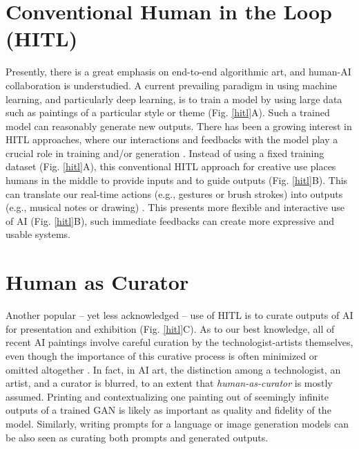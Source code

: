 \documentclass[letterpaper]{article} %
\begin{document}
\section{Conventional Human in the Loop (HITL)}

Presently, there is a great emphasis on end-to-end algorithmic art, and human-AI collaboration is understudied. A current prevailing paradigm in using machine learning, and particularly deep learning, is to train a model by using large data such as paintings of a particular style or theme (Fig. \ref{hitl}A). Such a trained model can reasonably generate new outputs. There has been a growing interest in HITL approaches, where our interactions and feedbacks with the model play a crucial role in training and/or generation \cite{HITLML}. Instead of using a fixed training dataset (Fig. \ref{hitl}A), this conventional HITL approach for creative use places humans in the middle to provide inputs and to guide outputs (Fig. \ref{hitl}B). This can translate our real-time actions (e.g., gestures or brush strokes) into outputs (e.g., musical notes or drawing) \cite{Fiebrink2009}. This presents more flexible and interactive use of AI (Fig. \ref{hitl}B), such immediate feedbacks can create more expressive and usable systems.

\section{Human as Curator}

Another popular -- yet less acknowledged -- use of HITL is to curate outputs of AI for presentation and exhibition (Fig. \ref{hitl}C). As to our best knowledge, all of recent AI paintings involve careful curation by the technologist-artists themselves, even though the importance of this curative process is often minimized or omitted altogether \cite[e.g.][]{GANEdmondBelamy, Elgammal2017}. In fact, in AI art, the distinction among a technologist, an artist, and a curator is blurred, to an extent that \emph{human-as-curator} is mostly assumed. Printing and contextualizing one painting out of seemingly infinite outputs of a trained GAN is likely as important as quality and fidelity of the model. Similarly, writing prompts for a language or image generation models can be also seen as curating both prompts and generated outputs.
\end{document}
